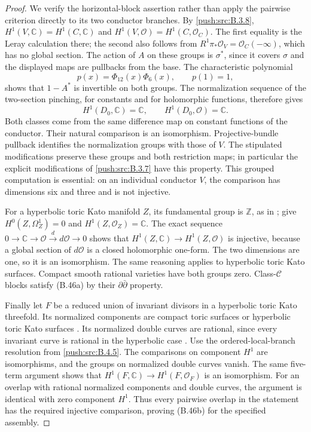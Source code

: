 \begin{proof}
We verify the horizontal-block assertion rather than
apply the pairwise criterion directly to its two
conductor branches. By \ref{push:src:B.3.8},
$H^1(V,\mathbb C)=H^1(C,\mathbb C)$ and
$H^1(V,\mathcal O)=H^1(C,\mathcal O_C)$.
The first equality is the Leray calculation there;
the second also follows from
$R^1\pi_*\mathcal O_V=\mathcal O_C(-\infty)$,
which has no global section. The action of $A$ on
these groups is $\sigma^*$, since it covers $\sigma$
and the displayed maps are pullbacks from the base.
The characteristic polynomial
\[
 p(x)=\Phi_{12}(x)\Phi_6(x),\qquad p(1)=1,
\]
shows that $1-A^*$ is invertible on both groups.
The normalization sequence of the two-section
pinching, for constants and for holomorphic
functions, therefore gives
\[
 H^1(D_0,\mathbb C)=\mathbb C,
 \qquad H^1(D_0,\mathcal O)=\mathbb C.
\]
Both classes come from the same difference map on
constant functions of the conductor. Their natural
comparison is an isomorphism. Projective-bundle
pullback identifies the normalization groups with
those of $V$. The stipulated modifications preserve
these groups and both restriction maps; in particular
the explicit modifications of \ref{push:src:B.3.7} have this property.
This grouped computation is essential: on an individual
conductor $V$, the comparison has dimensions six and
three and is not injective.

For a hyperbolic toric Kato manifold $Z$, its
fundamental group is $\mathbb Z$, as in
\cite[Section 2, p.1352]{IstratiEtAl2022Root};
\cite[Proposition 8.4 and Theorem 8.5]{IstratiEtAl2022Root}
give $H^0(Z,\Omega_Z^1)=0$ and
$H^1(Z,\mathcal O_Z)=\mathbb C$.
The exact sequence
$0\to\mathbb C\to\mathcal O\xrightarrow{d}d\mathcal O\to0$
shows that $H^1(Z,\mathbb C)\to H^1(Z,\mathcal O)$
is injective, because a global section of
$d\mathcal O$ is a closed holomorphic one-form.
The two dimensions are one, so it is an isomorphism.
The same reasoning applies to hyperbolic toric Kato
surfaces. Compact smooth rational varieties have
both groups zero. Class-$\mathcal C$ blocks satisfy
(B.46a) by their $\partial\bar\partial$ property.

Finally let $F$ be a reduced union of invariant
divisors in a hyperbolic toric Kato threefold.
Its normalized components are compact toric surfaces
or hyperbolic toric Kato surfaces
\cite[proof of Theorem 8.8, p.1380]{IstratiEtAl2022Root}.
Its normalized double curves are rational, since
every invariant curve is rational in the hyperbolic
case \cite[Theorem 5.2]{IstratiEtAl2022Root}.
Use the ordered-local-branch resolution from \ref{push:src:B.4.5}.
The comparisons on component $H^1$ are isomorphisms,
and the groups on normalized double curves vanish.
The same five-term argument shows that
$H^1(F,\mathbb C)\to H^1(F,\mathcal O_F)$ is an
isomorphism. For an overlap with rational normalized
components and double curves, the argument is
identical with zero component $H^1$. Thus every
pairwise overlap in the statement has the required
injective comparison, proving (B.46b) for the
specified assembly.


\end{proof}
